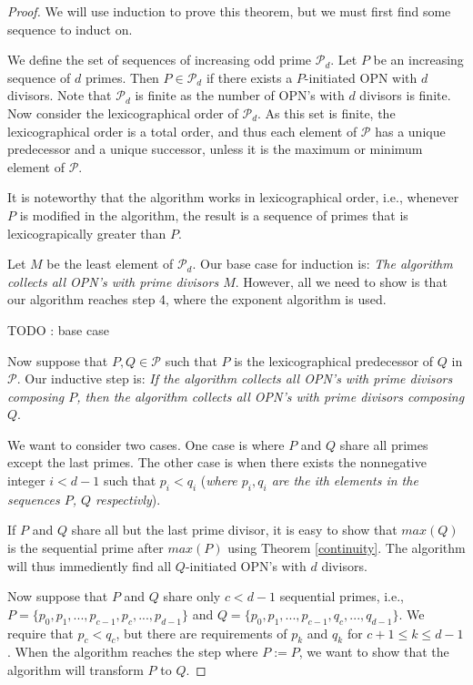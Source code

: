 \documentclass[../paper.tex]{subfiles}
\begin{document}
\begin{proof}
We will use induction to prove this theorem, but we must first
find some sequence to induct on.

We define the set of sequences of increasing odd prime $\mathcal{P}_d$.
Let $P$ be an increasing sequence of $d$ primes. Then $P \in
\mathcal{P}_d$ if there exists a $P$-initiated OPN with $d$
divisors. Note that $\mathcal{P}_d$ is finite as the number of OPN's
with $d$ divisors is finite\cite{dickson}. Now consider the
lexicographical order of $\mathcal{P}_d$. As this set is finite,
the lexicographical order is a total order, and thus each element
of $\mathcal{P}$ has a unique predecessor and a unique successor,
unless it is the maximum or minimum element of $\mathcal{P}$.

It is noteworthy that the algorithm works in lexicographical
order, i.e., whenever $P$ is modified in the algorithm, the result
is a sequence of primes that is lexicograpically greater than $P$.

Let $M$ be the least element of $\mathcal{P}_d$. Our base case
for induction is: \textit{The algorithm collects all OPN's with
prime divisors $M$}. However, all we need to show is that our algorithm
reaches step 4, where the exponent algorithm is used.

TODO : base case

Now suppose that $P, Q \in \mathcal{P}$ such that $P$ is the
lexicographical predecessor of $Q$ in $\mathcal{P}$. Our inductive
step is: \textit{If the algorithm collects all OPN's with prime
divisors composing $P$, then the algorithm collects all OPN's with
prime divisors composing $Q$}.

We want to consider two cases. One case is where $P$ and $Q$ share
all primes except the last primes. The other case is when there
exists the nonnegative integer $i < d - 1$ such that $p_i <
q_i$ (\textit{where $p_i, q_i$ are the ith elements in the
sequences $P$, $Q$ respectivly}).

If $P$ and $Q$ share all but the last prime divisor, it is easy to
show that $max(Q)$ is the sequential prime after $max(P)$ using
Theorem {\ref{continuity}}. The algorithm will thus immediently
find all $Q$-initiated OPN's with $d$ divisors.

Now suppose that $P$ and $Q$ share only $c < d - 1$ sequential 
primes, i.e., $P = \{ p_0, p_1, ..., p_{c - 1}, p_c, ..., p_{d-1}\}$
and $Q = \{p_0, p_1, ..., p_{c - 1}, q_c, ..., q_{d - 1}\}$. We
require that $p_c < q_c$, but there are requirements of $p_k$
and $q_k$ for $c + 1 \leq k \leq d - 1$. When the algorithm
reaches the step where $P := P$, we want to show that the
algorithm will transform $P$ to $Q$. 


\end{proof}
\end{document}
